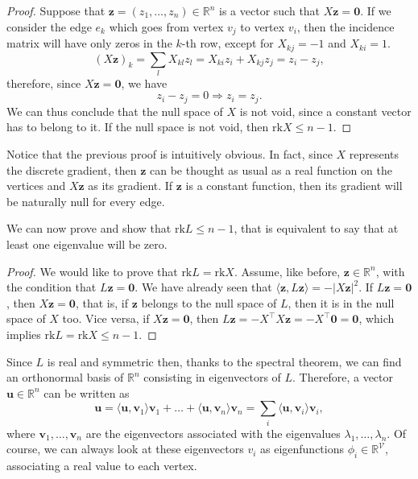 \documentclass[12pt,a4paper]{report}
\theoremstyle{definition}
\begin{document}
\begin{proof}
Suppose that $\mathbf{z} = (z_1, \ldots, z_n) \in \mathbb{R}^n$ is a vector such that $X \mathbf{z} = \mathbf{0}$.
If we consider the edge $e_k$ which goes from vertex $v_j$ to vertex $v_i$, then the incidence matrix will have only zeros in the $k$-th row, except for $X_{kj} = -1$ and $X_{ki}=1$.
\begin{equation*}
    \left( X \mathbf{z} \right)_k =
    \sum_l X_{kl} z_l =
    X_{ki} z_i + X_{kj} z_j =
    z_i - z_j ,
\end{equation*}
therefore, since $X \mathbf{z} = \mathbf{0}$, we have
\begin{equation*}
    z_i - z_j = 0 \Longrightarrow z_i = z_j .
\end{equation*}
We can thus conclude that the null space of $X$ is not void, since a constant vector has to belong to it.
If the null space is not void, then $\text{rk} X \leq n-1$.
\end{proof}
Notice that the previous proof is intuitively obvious.
In fact, since $X$ represents the discrete gradient, then $\textbf{z}$ can be thought as usual as a real function on the vertices and $X\textbf{z}$ as its gradient.
If $\textbf{z}$ is a constant function, then its gradient will be naturally null for every edge.

We can now prove  and show that $\text{rk} L \leq n-1$, that is equivalent to say that at least one eigenvalue will be zero.
\begin{proof}
We would like to prove that $\text{rk} L = \text{rk} X$.
Assume, like before, $\mathbf{z} \in \mathbb{R}^n$, with the condition that $L \mathbf{z} = \mathbf{0}$.
We have already seen that $ \langle \mathbf{z}, L \mathbf{z} \rangle = - |X \mathbf{z}|^2$.
If  $L \mathbf{z} = \mathbf{0}$, then $X \mathbf{z} = \mathbf{0}$, that is, if $\mathbf{z}$ belongs to the null space of $L$, then it is in the null space of $X$ too.
Vice versa, if $X \mathbf{z} = \mathbf{0}$, then $L \mathbf{z} = -X^\top X \mathbf{z} = -X^\top \mathbf{0} = \mathbf{0}$, which implies $\text{rk} L = \text{rk} X \leq n - 1$.
\end{proof}

Since $L$ is real and symmetric then, thanks to the spectral theorem, we can find an orthonormal basis of $\mathbb{R}^n$ consisting in eigenvectors of $L$.
Therefore, a vector $\mathbf{u} \in \mathbb{R}^n$ can be written as
\begin{equation*}
    \mathbf{u} = \langle \mathbf{u} , \mathbf{v}_1 \rangle \mathbf{v}_1 + 
    \ldots + \langle \mathbf{u} , \mathbf{v}_n \rangle \mathbf{v}_n = 
    \sum_i \langle \mathbf{u} , \mathbf{v}_i \rangle \mathbf{v}_i,
\end{equation*}
where $\mathbf{v}_1, \ldots, \mathbf{v}_n$ are the eigenvectors associated with the eigenvalues $\lambda_1, \ldots, \lambda_n$.
Of course, we can always look at these eigenvectors $v_i$ as eigenfunctions $\phi _i \in \mathbb{R}^\mathcal{V}$, associating a real value to each vertex.
\end{document}
